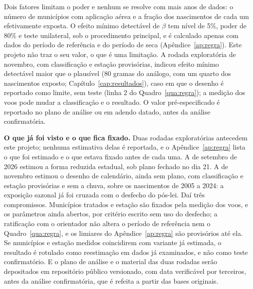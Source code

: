 Dois fatores limitam o poder e nenhum se resolve com mais anos de dados: o
número de municípios com aplicação aérea e a fração dos nascimentos de cada um
efetivamente exposta. O efeito mínimo detectável de $\beta$ tem nível de 5\%,
poder de 80\% e teste unilateral, sob o procedimento principal, e é calculado
apenas com dados do período de referência e do período de seca
(Apêndice~\ref{ap:regra}). Este projeto não traz o seu valor, o que é uma
limitação. A rodada exploratória de novembro, com classificação e estação
provisórias, indicou efeito mínimo detectável maior que o plausível (80 gramas do
análogo, com um quarto dos nascimentos exposto; Capítulo~\ref{cap:resultados}),
caso em que o desenho é reportado como limite, sem teste (linha 2 do
Quadro~\ref{qua:regra}); a medição dos voos pode mudar a classificação e o
resultado. O valor pré-especificado é reportado no
plano de análise ou em adendo datado, antes da análise confirmatória.

\textbf{O que já foi visto e o que fica fixado.} Duas rodadas exploratórias
antecedem este projeto; nenhuma estimativa delas é reportada, e o
Apêndice~\ref{ap:regra} lista o que foi estimado e o que estava fixado antes
de cada uma. A de setembro de 2026 estimou a forma reduzida estadual,
sob plano fechado no dia 21. A de novembro estimou o desenho de calendário,
ainda sem plano, com classificação e estação provisórias e sem a chuva, sobre
os nascimentos de 2005 a 2024: a exposição sazonal já foi cruzada com o
desfecho do pós-lei. Daí três compromissos. Municípios tratados e estação são
fixados pela medição dos voos, e os parâmetros ainda abertos, por critério
escrito sem uso do desfecho; a ratificação com o orientador não altera o
período de referência nem o Quadro~\ref{qua:regra}, e os limiares do
Apêndice~\ref{ap:regra} são provisórios até ela. Se municípios e estação
medidos coincidirem com variante já estimada, o resultado é rotulado como
reestimação em dados já examinados, e não como teste confirmatório. E o plano
de análise e o material das duas rodadas serão depositados em repositório
público versionado, com data verificável por terceiros, antes da análise
confirmatória, que é refeita a partir das bases originais.
